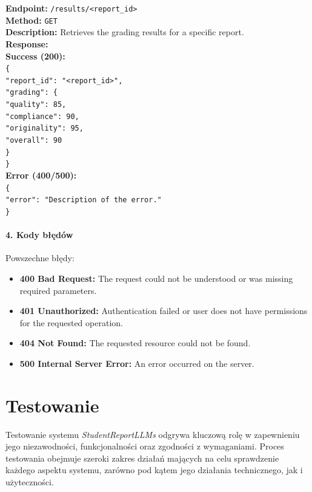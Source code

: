 \documentclass[a4paper, 12pt]{article}
\begin{document}
\begin{tabbing}
\textbf{Endpoint:} \= \texttt{/results/<report\_id>} \\
\textbf{Method:} \> \texttt{GET} \\
\textbf{Description:} \> Retrieves the grading results for a specific report. \\
\textbf{Response:} \\
\> \textbf{Success (200):} \\
\> \> \texttt{\{ \\
\> \> \> "report\_id": "<report\_id>", \\
\> \> \> "grading": \{ \\
\> \> \> \> "quality": 85, \\
\> \> \> \> "compliance": 90, \\
\> \> \> \> "originality": 95, \\
\> \> \> \> "overall": 90 \\
\> \> \> \} \\
\> \> \}} \\
\> \textbf{Error (400/500):} \\
\> \> \texttt{\{ \\
\> \> \> "error": "Description of the error." \\
\> \> \}}
\end{tabbing}

\paragraph{4. Kody błędów}

Powszechne błędy:
\begin{itemize}
\item \textbf{400 Bad Request:} The request could not be understood or was missing required parameters.
\item \textbf{401 Unauthorized:} Authentication failed or user does not have permissions for the requested operation.
\item \textbf{404 Not Found:} The requested resource could not be found.
\item \textbf{500 Internal Server Error:} An error occurred on the server.
\end{itemize}

\newpage
\section{Testowanie}
Testowanie systemu \textit{StudentReportLLMs} odgrywa kluczową rolę w zapewnieniu jego niezawodności, funkcjonalności oraz zgodności z wymaganiami. Proces testowania obejmuje szeroki zakres działań mających na celu sprawdzenie każdego aspektu systemu, zarówno pod kątem jego działania technicznego, jak i użyteczności.
\end{document}
